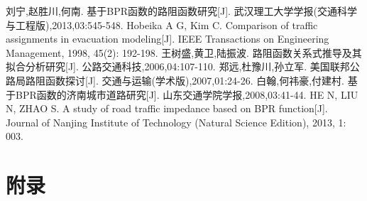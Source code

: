 \documentclass{xcumcmart}
\begin{document}
\begin{thebibliography}{1}
刘宁,赵胜川,何南. 基于BPR函数的路阻函数研究[J]. 武汉理工大学学报(交通科学与工程版),2013,03:545-548.
Hobeika A G, Kim C. Comparison of traffic assignments in evacuation modeling[J]. IEEE Transactions on Engineering Management, 1998, 45(2): 192-198.
王树盛,黄卫,陆振波. 路阻函数关系式推导及其拟合分析研究[J]. 公路交通科技,2006,04:107-110.
郑远,杜豫川,孙立军. 美国联邦公路局路阻函数探讨[J]. 交通与运输(学术版),2007,01:24-26.
白翰,何祎豪,付建村. 基于BPR函数的济南城市道路研究[J]. 山东交通学院学报,2008,03:41-44.
HE N, LIU N, ZHAO S. A study of road traffic impedance based on BPR function[J]. Journal of Nanjing Institute of Technology (Natural Science Edition), 2013, 1: 003.
\end{thebibliography}
\newpage
\appendix
\section{附录}

\end{document}
